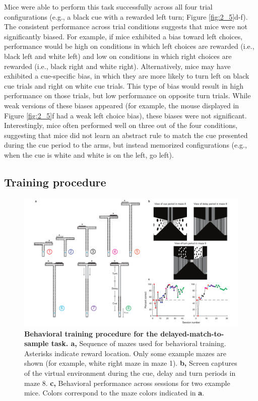 \bigskip
Mice were able to perform this task successfully across all four trial configurations (e.g., a black cue with a rewarded left turn; Figure \ref{fig:2_5}d-f). The consistent performance across trial conditions suggests that mice were not significantly biased. For example, if mice exhibited a bias toward left choices, performance would be high on conditions in which left choices are rewarded (i.e., black left and white left) and low on conditions in which right choices are rewarded (i.e., black right and white right). Alternatively, mice may have exhibited a cue-specific bias, in which they are more likely to turn left on black cue trials and right on white cue trials. This type of bias would result in high performance on those trials, but low performance on opposite turn trials. While weak versions of these biases appeared (for example, the mouse displayed in Figure \ref{fig:2_5}f had a weak left choice bias), these biases were not significant. Interestingly, mice often performed well on three out of the four conditions, suggesting that mice did not learn an abstract rule to match the cue presented during the cue period to the arms, but instead memorized configurations (e.g., when the cue is white and white is on the left, go left).

\subsection{Training procedure} \label{sec:dms_train}

\begin{figure}
\includegraphics[width=1.05\textwidth,center]{figures/fig_2_6.pdf}
\caption[Behavioral training procedure for the delayed-match-to-sample task]{\textbf{Behavioral training procedure for the delayed-match-to-sample task. a,}
Sequence of mazes used for behavioral training. Asterisks indicate reward location. Only some example mazes are shown (for example, white right maze in maze 1).  
%
\textbf{b,} Screen captures of the virtual environment during the cue, delay and turn periods in maze 8. 
%
\textbf{c,} Behavioral performance across sessions for two example mice. Colors correspond to the maze colors indicated in \textbf{a}. 
\label{fig:2_6}}
\end{figure}

